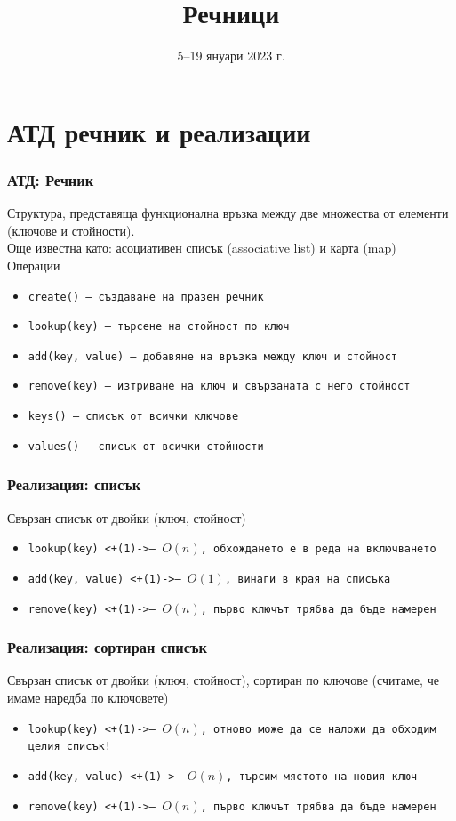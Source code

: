 \documentclass[alsotrans]{beamerswitch}
\title{Речници}
\date{5--19 януари 2023 г.}
\begin{document}
\begin{frame}
  \titlepage
\end{frame}

\section{АТД речник и реализации}

\begin{frame}
  \frametitle{АТД: Речник}
  Структура, представяща функционална връзка между две множества от елементи (ключове и стойности).\\[2ex]
  \pause
  Още известна като: асоциативен списък (associative list) и карта (map)\\[2ex]
  \pause
  Операции
  \begin{itemize}
  \item \tt{create()} --- създаване на празен речник
  \item \tt{lookup(key)} --- търсене на стойност по ключ
  \item \tt{add(key, value)} --- добавяне на връзка между ключ и стойност
  \item \tt{remove(key)} --- изтриване на ключ и свързаната с него стойност
  \item \tt{keys()} --- списък от всички ключове
  \item \tt{values()} --- списък от всички стойности
  \end{itemize}
\end{frame}

\begin{frame}
  \frametitle{Реализация: списък}
  Свързан списък от двойки (ключ, стойност)
  \pause
  \begin{itemize}
  \item \tt{lookup(key)} \onslide<+(1)->{--- $O(n)$, обхождането е в реда на включването}
  \item \tt{add(key, value)} \onslide<+(1)->{--- $O(1)$, винаги в края на списъка}
  \item \tt{remove(key)} \onslide<+(1)->{--- $O(n)$, първо ключът трябва да бъде намерен}
  \end{itemize}
\end{frame}

\begin{frame}
  \frametitle{Реализация: сортиран списък}
  Свързан списък от двойки (ключ, стойност), сортиран по ключове (считаме, че имаме наредба по ключовете)
  \pause
  \begin{itemize}
  \item \tt{lookup(key)} \onslide<+(1)->{--- $O(n)$, отново може да се наложи да обходим целия списък!}
  \item \tt{add(key, value)} \onslide<+(1)->{--- \alert{$O(n)$}, търсим мястото на новия ключ}
  \item \tt{remove(key)} \onslide<+(1)->{--- $O(n)$, първо ключът трябва да бъде намерен}
  \end{itemize}
\end{frame}
\end{document}
